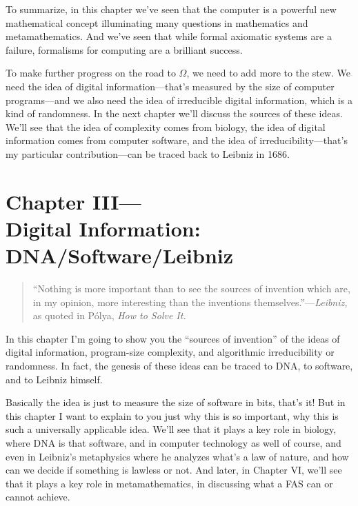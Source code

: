 \documentclass[12pt]{book}
\begin{document}
To summarize, in this chapter we've seen that the computer is a powerful new mathematical
concept illuminating many questions in mathematics and metamathematics.
And we've seen that while formal axiomatic systems are a failure, formalisms for computing
are a brilliant success.
 
To make further progress on the road to $\Omega$, we need to add more to the stew. We need
the idea of digital information---that's measured by the size of computer programs---and
we also need the idea of irreducible digital information, which is a kind of randomness.
In the next chapter we'll discuss the sources of these ideas. We'll see that the
idea of complexity comes from biology, the idea of digital information comes from
computer software, and the idea of irreducibility---that's my particular contribution---can
be traced back to Leibniz in 1686.

\chapter*{Chapter III---\\Digital Information: DNA/Software/Leibniz}

\begin{quote}
``Nothing is more important than to see the sources of invention which are,
in my opinion, more interesting than the inventions themselves.''---\emph{Leibniz,}
as quoted in P\'olya, \emph{How to Solve It.}
\end{quote}

In this chapter I'm going to show you the ``sources of invention''
of the ideas of digital information, program-size complexity, and algorithmic
irreducibility or randomness.
In fact, the genesis of these ideas can be traced to DNA, to software, and to Leibniz himself.
 
Basically the idea is just to measure the size of software in bits, that's it!
But in this chapter I want to explain to you just why this is so important, 
why this is such a universally applicable idea.
We'll see that it plays a key role in biology, where DNA is that software,
and in computer technology as well of course, and even in Leibniz's metaphysics
where he analyzes what's a law of nature, and how can we decide if something
is lawless or not. And later, in Chapter VI, we'll see that it plays a key role in
metamathematics, in discussing what a FAS can or cannot achieve.
 
\end{document}
